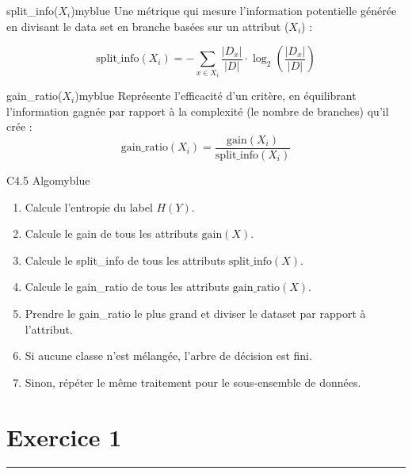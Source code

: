 \documentclass{article}
\newcommand{\exer}[1]{
  \section*{Exercice #1}
  \vspace{-0.5cm}
  \noindent\rule{\textwidth}{0.5pt}%
}
\begin{document}
\begin{prettyBox}{split\_info($X_i$)}{myblue}
    Une métrique qui mesure l'information potentielle générée en divisant le data set en branche basées sur un attribut ($X_i$) :

    \[ \text{split\_info} (X_i) = -\sum_{x \in X_i} \dfrac{|D_{x}|}{|D|} \cdot \log_2\left( \dfrac{|D_{x}|}{|D|} \right)  \]
\end{prettyBox}

\vspace{0.35cm}

\begin{prettyBox}{gain\_ratio($X_i$)}{myblue}
    Représente l'efficacité d'un critère, en équilibrant l'information gagnée par rapport à la complexité (le nombre de branches) qu'il crée :
    \[
        \text{gain\_ratio}(X_i) = \dfrac{\text{gain}(X_i)}{\text{split\_info}(X_i)}
    \]
\end{prettyBox}

\vspace{0.35cm}

\begin{prettyBox}{C4.5 Algo}{myblue}
    \begin{enumerate}
        \setlength{\itemsep}{0pt}
        \item Calcule l'entropie du label $H(Y)$.
        \item Calcule le gain de tous les attributs $\text{gain}(X)$.
        \item Calcule le split\_info de tous les attributs $\text{split\_info}(X)$.
        \item Calcule le gain\_ratio de tous les attributs $\text{gain\_ratio}(X)$.
        \item Prendre le gain\_ratio le plus grand et diviser le dataset par rapport à l'attribut.
        \item Si aucune classe n'est mélangée, l'arbre de décision est fini.
        \item Sinon, répéter le même traitement pour le sous-ensemble de données.
    \end{enumerate}
\end{prettyBox}

\newpage

\exer{1}

\vspace{0.25cm}
\end{document}
